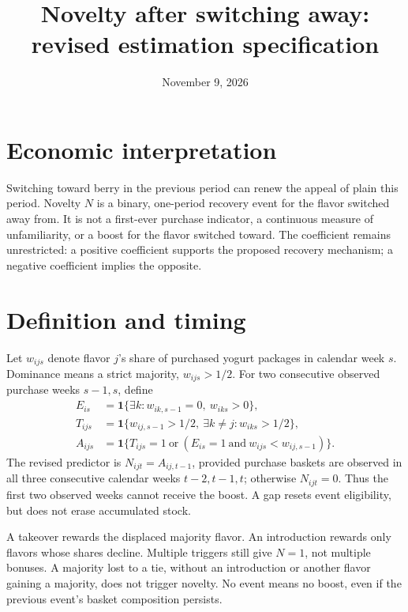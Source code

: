 \documentclass[11pt]{article}
\title{Novelty after switching away: revised estimation specification}
\author{}\date{November 9, 2026}
\begin{document}
\maketitle
\section*{Economic interpretation}
Switching toward berry in the previous period can renew the appeal of plain
this period. Novelty $N$ is a binary, one-period recovery event for the flavor
switched away from. It is not a first-ever purchase indicator, a continuous
measure of unfamiliarity, or a boost for the flavor switched toward.
The coefficient remains unrestricted: a positive coefficient supports the
proposed recovery mechanism; a negative coefficient implies the opposite.

\section*{Definition and timing}
Let $w_{ijs}$ denote flavor $j$'s share of purchased yogurt packages in calendar
week $s$. Dominance means a strict majority, $w_{ijs}>1/2$.
For two consecutive observed purchase weeks $s-1,s$, define
\begin{align*}
 E_{is}&=\mathbf 1\{\exists k:w_{ik,s-1}=0,\ w_{iks}>0\},\\
 T_{ijs}&=\mathbf 1\{w_{ij,s-1}>1/2,\ \exists k\ne j:w_{iks}>1/2\},\\
 A_{ijs}&=\mathbf 1\{T_{ijs}=1\ \text{or}\ (E_{is}=1\ \text{and}\ w_{ijs}<w_{ij,s-1})\}.
\end{align*}
The revised predictor is $N_{ijt}=A_{ij,t-1}$, provided purchase baskets
are observed in all three consecutive calendar weeks $t-2,t-1,t$; otherwise
$N_{ijt}=0$. Thus the first two observed weeks cannot receive the boost.
A gap resets event eligibility, but does not erase accumulated stock.

A takeover rewards the displaced majority flavor. An introduction rewards
only flavors whose shares decline. Multiple triggers still give $N=1$, not
multiple bonuses. A majority lost to a tie, without an introduction or another
flavor gaining a majority, does not trigger novelty. No event means no boost,
even if the previous event's basket composition persists.
\end{document}
